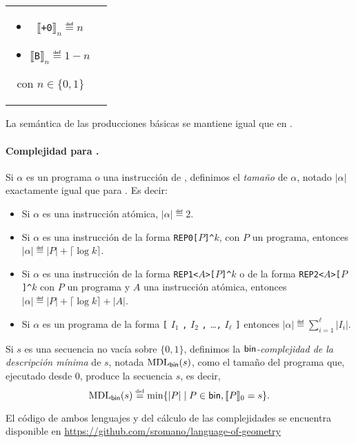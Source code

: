 \begin{tabular}{cc}
    \begin{minipage}[t]{0.45\textwidth}
        \begin{itemize}
        \item $\llbracket$\verb#+0#$\rrbracket_n  \eqdef  n$ 
        \item $\llbracket$\verb#B#$ \rrbracket_n  \eqdef  1-n $  
        \end{itemize}
    \end{minipage}
    \begin{minipage}[t]{0.45\textwidth}
        \par\smallskip
        con $n \in \{0,1\}$
    \end{minipage}
\end{tabular}


\medskip

La semántica de las producciones básicas se mantiene igual que en \gramgeo.

\paragraph{Complejidad para \grambin.} 

Si $\alpha$ es un programa o una instrucción de \grambin, definimos el {\em tamaño} de $\alpha$, notado $|\alpha|$ exactamente igual que para \grambin. Es decir:
%
\begin{itemize}
\item Si $\alpha$ es una instrucción atómica, $|\alpha|\eqdef 2$.

\item Si $\alpha$ es una instrucción de la forma 
\verb#REP0[#$P$\verb#]^#$k$, con $P$ un programa, 
entonces $|\alpha|\eqdef |P|+\lceil \log k\rceil$.

\item Si $\alpha$ es una instrucción de la forma 
\verb#REP1<#$A$\verb#>[#$P$\verb#]^#$k$ o de la forma 
\verb#REP2<#$A$\verb#>[#$P$\verb#]^#$k$ 
con $P$ un programa y $A$ una instrucción atómica, 
entonces $|\alpha|\eqdef |P|+\lceil \log k\rceil+|A|$.

\item Si $\alpha$ es un programa de la forma
\verb#[# $I_1$ \verb#,# $I_2$ \verb#,# \dots \verb#,# $I_\ell$ \verb#]#
entonces $|\alpha|\eqdef \sum_{i=1}^\ell|I_i|$.
\end{itemize}
%
Si $s$ es una secuencia no vacía sobre $\{0,1\}$, definimos la {\em ${\sf bin}$-complejidad de la descripción mínima} de $s$, notada ${\rm MDL}_{{\sf bin}}(s)$, como el tamaño del programa que, ejecutado desde 0, produce la secuencia $s$, es decir,
$$
{\rm MDL}_{{\sf bin}}(s)\stackrel{\scriptscriptstyle \mathrm{def}}{=}\min\{|P|\mid P\in{\sf bin},\llbracket P\rrbracket_0=s\}.
$$


El código de ambos lenguajes y del cálculo de las complejidades se encuentra disponible en \hyperref[https://github.com/sromano/language-of-geometry]{\url{https://github.com/sromano/language-of-geometry}}

\renewcommand{\thetable}{\arabic{chapter}.\arabic{figure}}
\renewcommand{\thefigure}{\arabic{chapter}.\arabic{figure}}